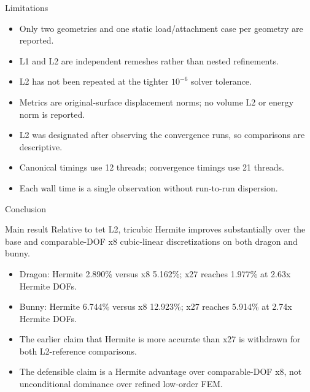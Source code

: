 \documentclass[aspectratio=169,10pt]{beamer}
\newcommand{\pct}[1]{#1\%}
\begin{document}
\begin{frame}{Limitations}
  \small
  \begin{itemize}
    \item Only two geometries and one static load/attachment case per geometry are reported.
    \item L1 and L2 are independent remeshes rather than nested refinements.
    \item L2 has not been repeated at the tighter $10^{-6}$ solver tolerance.
    \item Metrics are original-surface displacement norms; no volume L2 or energy norm is reported.
    \item L2 was designated after observing the convergence runs, so comparisons are descriptive.
    \item Canonical timings use 12 threads; convergence timings use 21 threads.
    \item Each wall time is a single observation without run-to-run dispersion.
  \end{itemize}
\end{frame}

\begin{frame}{Conclusion}
  \small
  \begin{block}{Main result}
    Relative to tet L2, tricubic Hermite improves substantially over the base
    and comparable-DOF x8 cubic-linear discretizations on both dragon and bunny.
  \end{block}

  \vspace{0.6em}
  \begin{itemize}
    \item Dragon: Hermite \pct{2.890} versus x8 \pct{5.162}; x27 reaches \pct{1.977} at 2.63x Hermite DOFs.
    \item Bunny: Hermite \pct{6.744} versus x8 \pct{12.923}; x27 reaches \pct{5.914} at 2.74x Hermite DOFs.
    \item The earlier claim that Hermite is more accurate than x27 is withdrawn for both L2-reference comparisons.
    \item The defensible claim is a Hermite advantage over comparable-DOF x8, not unconditional dominance over refined low-order FEM.
  \end{itemize}
\end{frame}
\end{document}
